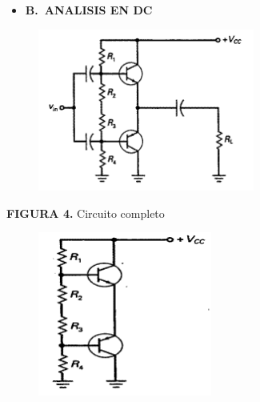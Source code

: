 \documentclass[12pt]{article}
\begin{document}
\begin{itemize}
	\item \textbf{B. ANALISIS EN DC}
\end{itemize}\par




\begin{figure}[H]
	\begin{Center}
		\includegraphics[width=2.81in,height=2.1in]{./media/image4.gif}
	\end{Center}
\end{figure}



\par

\textbf{FIGURA 4.} Circuito completo \par




\begin{figure}[H]
	\begin{Center}
		\includegraphics[width=2.25in,height=2.12in]{./media/image5.gif}
	\end{Center}
\end{figure}
\end{document}
